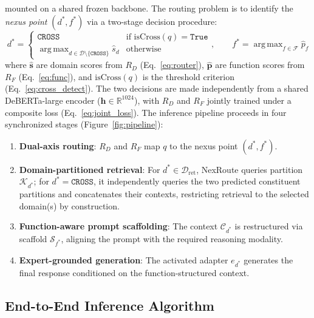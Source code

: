 \documentclass[a4paper,fleql,doubleblind]{cas-sc}
\DeclareMathOperator*{\argmax}{arg\,max}
\begin{document}
mounted on a shared frozen backbone. The routing problem is to identify the
\textit{nexus point} $(d^*, f^*)$ via a two-stage decision procedure:
\begin{equation}
    d^* = \begin{cases}
        \texttt{CROSS} & \text{if } \mathrm{isCross}(q) = \texttt{True} \\
        \displaystyle\argmax_{d \in \mathcal{D} \setminus \{\texttt{CROSS}\}} \hat{s}_d & \text{otherwise}
    \end{cases},
    \qquad
    f^* = \argmax_{f \in \mathcal{F}} \hat{p}_f
    \label{eq:nexus_joint}
\end{equation}
where $\hat{\mathbf{s}}$ are domain scores from $R_D$ (Eq.~\ref{eq:router}), $\hat{\mathbf{p}}$ are function scores from $R_F$ (Eq.~\ref{eq:func}), and $\mathrm{isCross}(q)$ is the threshold criterion (Eq.~\ref{eq:cross_detect}). The two decisions are made independently from a shared DeBERTa-large encoder ($\mathbf{h} \in \mathbb{R}^{1024}$), with $R_D$ and $R_F$ jointly trained under a composite loss (Eq.~\ref{eq:joint_loss}).
The inference pipeline proceeds in four synchronized stages
(Figure~\ref{fig:pipeline}):
\begin{enumerate}
    \item \textbf{Dual-axis routing}: $R_D$ and $R_F$ map $q$ to the nexus
    point $(d^*, f^*)$.
    \item \textbf{Domain-partitioned retrieval}: For $d^* \in \mathcal{D}_{\text{ret}}$,
    NexRoute queries partition $\mathcal{K}_{d^*}$; for $d^*{=}\texttt{CROSS}$, it
    independently queries the two predicted constituent partitions and concatenates their
    contexts, restricting retrieval to the selected domain(s) by construction.
    \item \textbf{Function-aware prompt scaffolding}: The context
    $\mathcal{C}_{d^*}$ is restructured via scaffold $\mathcal{S}_{f^*}$,
    aligning the prompt with the required reasoning modality.
    \item \textbf{Expert-grounded generation}: The activated adapter $e_{d^*}$
    generates the final response conditioned on the function-structured context.
\end{enumerate}

\subsection{End-to-End Inference Algorithm}
\label{ssec:algorithm}
\end{document}
